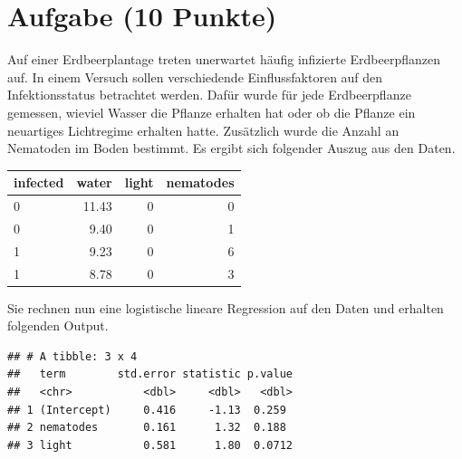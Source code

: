 \documentclass[a4paper, 10pt]{scrartcl}\usepackage[]{graphicx}\usepackage[]{color}
\makeatletter
\newenvironment{kframe}{%
 \def\at@end@of@kframe{}%
 \ifinner\ifhmode%
  \def\at@end@of@kframe{\end{minipage}}%
  \begin{minipage}{\columnwidth}%
 \fi\fi%
 \def\FrameCommand##1{\hskip\@totalleftmargin \hskip-\fboxsep
 \colorbox{shadecolor}{##1}\hskip-\fboxsep
     \hskip-\linewidth \hskip-\@totalleftmargin \hskip\columnwidth}%
 \MakeFramed {\advance\hsize-\width
   \@totalleftmargin\z@ \linewidth\hsize
   \@setminipage}}%
 {\par\unskip\endMakeFramed%
 \at@end@of@kframe}
\newenvironment{knitrout}{}{} %
\makeatother
\begin{document}
\clearpage

\section{Aufgabe \hfill (10 Punkte)}



Auf einer Erdbeerplantage treten unerwartet h{\"a}ufig infizierte
Erdbeerpflanzen auf. In einem Versuch sollen verschiedende Einflussfaktoren
auf den Infektionsstatus betrachtet werden. Daf{\"u}r wurde f{\"u}r jede
Erdbeerpflanze gemessen, wieviel Wasser die Pflanze erhalten hat oder ob
die Pflanze ein neuartiges Lichtregime erhalten hatte. Zus{\"a}tzlich wurde die
Anzahl an Nematoden im Boden bestimmt. Es ergibt sich folgender Auszug aus
den Daten.

\begin{knitrout}
\color{fgcolor}\begin{table}[!h]
\centering
\begin{tabular}{lrrr}
\toprule
infected & water & light & nematodes\\
\midrule
0 & 11.43 & 0 & 0\\
0 & 9.40 & 0 & 1\\
1 & 9.23 & 0 & 6\\
1 & 8.78 & 0 & 3\\
\bottomrule
\end{tabular}
\end{table}

\end{knitrout}

Sie rechnen nun eine logistische lineare Regression auf den Daten und erhalten
folgenden \Rlogo Output.

\begin{knitrout}
\color{fgcolor}\begin{kframe}
\begin{verbatim}
## # A tibble: 3 x 4
##   term        std.error statistic p.value
##   <chr>           <dbl>     <dbl>   <dbl>
## 1 (Intercept)     0.416     -1.13  0.259 
## 2 nematodes       0.161      1.32  0.188 
## 3 light           0.581      1.80  0.0712
\end{verbatim}
\end{kframe}
\end{knitrout}
\end{document}
